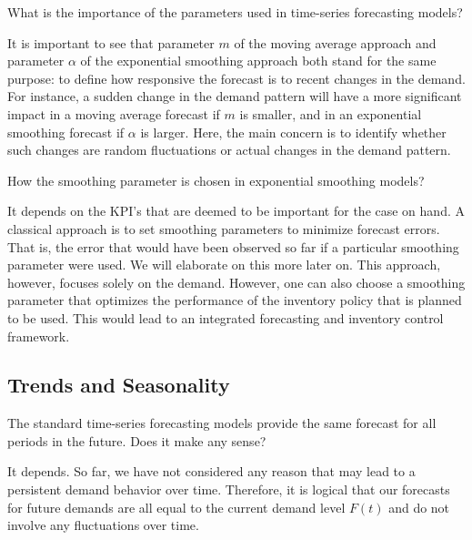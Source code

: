 \begin{exercise}
What is the importance of the parameters used in time-series forecasting models?



  \begin{solution}
It is important to see that parameter $m$ of the moving average approach and parameter $\alpha$ of the exponential smoothing approach both stand for the same purpose: to define how responsive the forecast is to recent changes in the demand. For instance, a sudden change in the demand pattern will have a more significant impact in a moving average forecast if $m$ is smaller, and in an exponential smoothing forecast if $\alpha$ is larger. Here, the main concern is to identify whether such changes are random fluctuations or actual changes in the demand pattern. 
    
      \end{solution}
\end{exercise}


\begin{exercise}
How the smoothing parameter is chosen in exponential smoothing models?



  \begin{solution}
	It depends on the KPI's that are deemed to be important for the case on hand. A classical approach is to set smoothing parameters to minimize forecast errors. That is, the error that would have been observed so far if a particular smoothing parameter were used. 	We will elaborate on this more later on. This approach, however, focuses solely on the demand. However, one can also choose a smoothing parameter that optimizes the performance of the inventory policy that is planned to be used. This would lead to an integrated forecasting and inventory control framework.
	
  \end{solution}
\end{exercise}

\subsection{Trends and Seasonality}

\begin{exercise}
The standard time-series forecasting models provide the same forecast for all periods in the future. Does it make any sense? 


  \begin{solution}
    It depends. So far, we have not considered any reason that may lead to a persistent demand behavior over time. Therefore, it is logical that our forecasts for future demands are all equal to the current demand level $F(t)$ and do not involve any fluctuations over time.     
      \end{solution}
\end{exercise}


